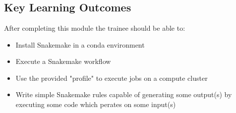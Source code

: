 
\chapter{\moduleTitle}
\newpage


% 
\section{Key Learning Outcomes}

After completing this module the trainee should be able to:
\begin{itemize}
  \item Install Snakemake in a conda environment
  \item Execute a Snakemake workflow
  \item Use the provided "profile" to execute jobs on a compute cluster
  \item Write simple Snakemake rules capable of generating some output(s) by executing some code which perates on some input(s)
\end{itemize}


